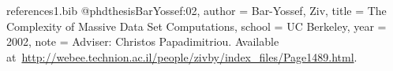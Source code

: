 \documentclass[10pt]{article}
\begin{document}
\begin{filecontents}{references1.bib}
@phdthesis{BarYossef:02,
  author = {Bar-Yossef, Ziv},
  title = {The Complexity of Massive Data Set Computations},
  school = {UC Berkeley},
  year = {2002},
  note = {Adviser: Christos Papadimitriou. Available at~\url{http://webee.technion.ac.il/people/zivby/index_files/Page1489.html}.}
}
\end{filecontents}


\end{document}
